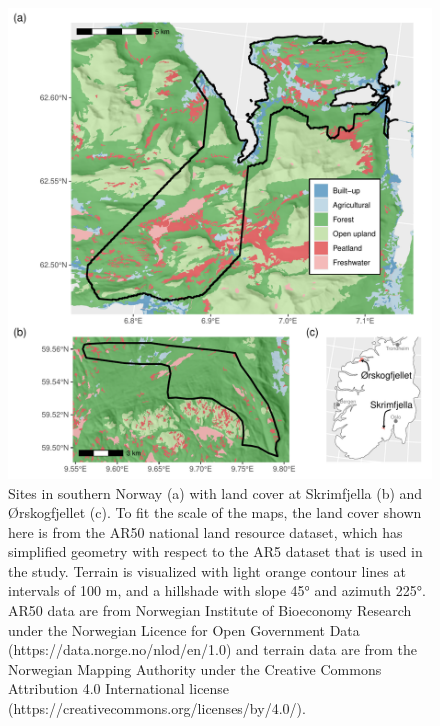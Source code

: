 \documentclass[soil, manuscript]{copernicus}
\begin{document}
\begin{figure}
\includegraphics[height=0.81\textheight]{figures/sites-patchwork} \caption{Sites in southern Norway (a) with land cover at Skrimfjella (b) and Ørskogfjellet (c). To fit the scale of the maps, the land cover shown here is from the AR50 national land resource dataset, which has simplified geometry with respect to the AR5 dataset that is used in the study. Terrain is visualized with light orange contour lines at intervals of 100 m, and a hillshade with slope 45° and azimuth 225°. AR50 data are from Norwegian Institute of Bioeconomy Research under the Norwegian Licence for Open Government Data (https://data.norge.no/nlod/en/1.0) and terrain data are from the Norwegian Mapping Authority under the Creative Commons Attribution 4.0 International license (https://creativecommons.org/licenses/by/4.0/).}\label{fig:sites}
\end{figure}
\end{document}

